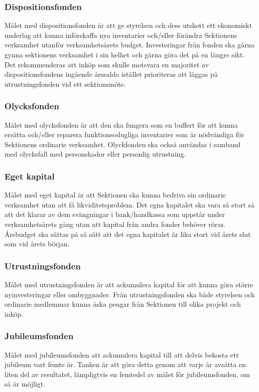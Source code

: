 \documentclass[../_main/handlingar.tex]{subfiles}
\begin{document}
\subsubsection*{Dispositionsfonden}
Målet med dispositionsfonden är att ge styrelsen och dess utskott ett ekonomiskt underlag att kunna införskaffa nya inventarier och/eller förändra Sektionens verksamhet utanför verksamhetsårets budget. Investeringar från fonden ska gärna gynna sektionens verksamhet i sin helhet och gärna göra det på en längre sikt. Det rekommenderas att inköp som skulle motsvara en majoritet av dispositionsfondens ingående årssaldo istället prioriteras att läggas på utrustningsfonden vid ett sektionsmöte.

\subsubsection*{Olycksfonden}
Målet med olycksfonden är att den ska fungera som en buffert för att kunna ersätta och/eller reparera funktionsodugliga inventarier som är nödvändiga för Sektionens ordinarie verksamhet. Olyckfonden ska också användas i samband med olycksfall med personskador eller personlig utrustning.

\subsubsection*{Eget kapital}
Målet med eget kapital är att Sektionen ska kunna bedriva sin ordinarie verksamhet utan att få likviditetsproblem. Det egna kapitalet ska vara så stort så att det klarar av dem svängningar i bank/handkassa som uppstår under verksamhetsårets gång utan att kapital från andra fonder behöver röras. Årsbudget ska sättas på så sätt att det egna kapitalet är lika stort vid årets slut som vid årets början.

\subsubsection*{Utrustningsfonden}
Målet med utrustningsfonden är att ackumulera kapital för att kunna göra större nyinvesteringar eller ombyggnader. Från utrustningsfonden ska både styrelsen och ordinarie medlemmar kunna äska pengar från Sektionen till olika projekt och inköp.

\subsubsection*{Jubileumsfonden}
Målet med jubileumsfonden att ackumulera kapital till att delvis bekosta ett jubileum vart femte år. Tanken är att göra detta genom att varje år avsätta en liten del av resultatet, lämpligtvis en femtedel av målet för jubileumsfonden, om så är möjligt.
\end{document}
